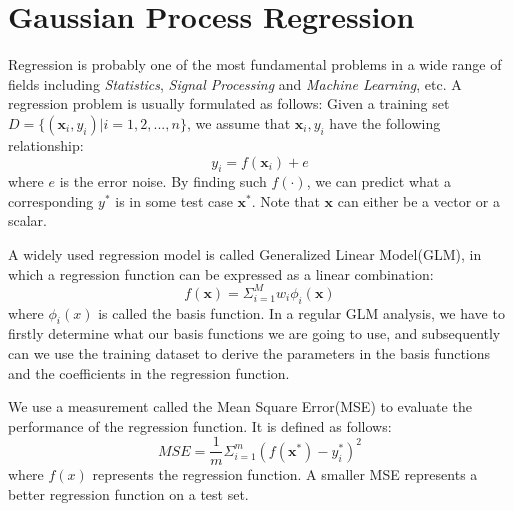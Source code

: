 \section{Gaussian Process Regression} \label{sec:intro}

Regression is probably one of the most fundamental problems in a wide range of fields including \emph{Statistics}, \emph{Signal Processing} and \emph{Machine Learning}, etc. A regression problem is usually formulated as follows:
Given a training set $D = \{ (\textbf{x}_{i}, y_{i}) | i = 1,2,...,n \}$, we assume that $\textbf{x}_{i}, y_{i}$ have the following relationship:
	\begin{equation}
		y_{i} = f(\textbf{x}_{i}) + e
	\end{equation}
where $e$ is the error noise. By finding such $f(\cdot)$, we can predict what a corresponding $y^{*}$ is in some test case $\textbf{x}^{*}$. Note that $\textbf{x}$ can either be a vector or a scalar.

A widely used regression model is called Generalized Linear Model(GLM)\cite{mccullagh1984generalized}, in which a regression function can be expressed as a linear combination:
	\begin{equation}
		f(\textbf{x}) = \Sigma_{i=1}^{M} w_{i}\phi_i (\textbf{x})
	\end{equation}
where $\phi_{i}(x)$ is called the basis function.
In a regular GLM analysis, we have to firstly determine what our basis functions we are going to use, and subsequently can we use the training dataset to derive the parameters in the basis functions and the coefficients in the regression function.
	
We use a measurement called the Mean Square Error(MSE) to evaluate the performance of the regression function. It is defined as follows:
	\begin{equation}
		MSE = \frac{1}{m}\Sigma^{m}_{i=1} (f(\textbf{x}^{*})-y_{i}^{*})^{2}
	\end{equation}
where $f(x)$ represents the regression function. A smaller MSE represents a better regression function on a test set.





